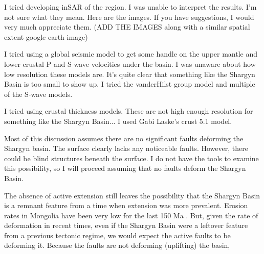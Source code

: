 \documentclass[10pt,a4paper]{article}
\begin{document}
\doublespacing

I tried developing inSAR of the region. I was unable to interpret the results. I'm not sure what they mean. Here are the images. If you have suggestions, I would very much appreciate them. (ADD THE IMAGES along with a similar spatial extent google earth image)

I tried using a global seismic model to get some handle on the upper mantle and lower crustal P and S wave velocities under the basin. I was unaware about how low resolution these models are. It's quite clear that something like the Shargyn Basin is too small to show up. I tried the vanderHilst group model and multiple of the S-wave models.

I tried using crustal thickness models. These are not high enough resolution for something like the Shargyn Basin... I used Gabi Laske's crust 5.1 model.

	Most of this discussion assumes there are no significant faults deforming the Shargyn basin. The surface clearly lacks any noticeable faults. However, there could be blind structures beneath the surface. I do not have the tools to examine this possibility, so I will proceed assuming that no faults deform the Shargyn Basin. 

	The absence of active extension still leaves the possibility that the Shargyn Basin is a remnant feature from a time when extension was more prevalent. Erosion rates in Mongolia have been very low for the last 150 Ma \citep{Jolivet2007}. But, given the rate of deformation in recent times, even if the Shargyn Basin were a leftover feature from a previous tectonic regime, we would expect the active faults to be deforming it. Because the faults are not deforming (uplifting) the basin, 
\end{document}

